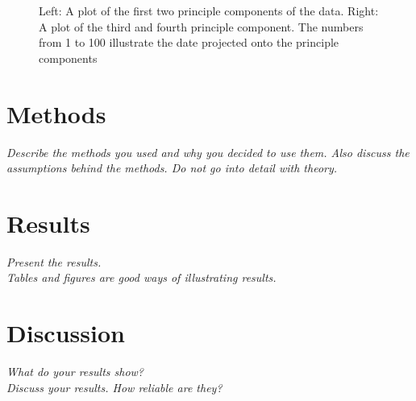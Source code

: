 \documentclass[11pt, fleqn, titlepage]{article}
\begin{document}
\begin{figure}[H]
	\centering
	\qquad
	\caption{Left: A plot of the first two principle components of the data. Right: A plot of the third and fourth principle component. The numbers from 1 to 100 illustrate the date projected onto the principle components}%
	\label{fig:example}%
\end{figure}


\section{Methods}
\textit{Describe the methods you used and why you decided to use them. Also discuss the assumptions behind the methods. Do not go into detail with theory.}

\section{Results}
\textit{Present the results. \\ Tables and figures are good ways of illustrating results.}

\section{Discussion}
\textit{What do your results show? \\ Discuss your results. How reliable are they?}
\end{document}
